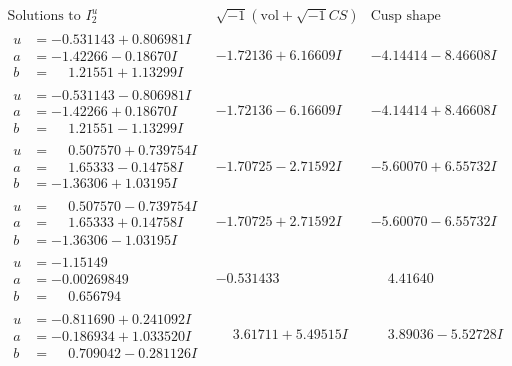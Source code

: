 \documentclass[1p]{elsarticle_modified}
\theoremstyle{definition}
\newcommand{\I}{\sqrt{-1}}
\begin{document}
$$\begin{array}{c|c|c}  
\text{Solutions to }I^u_{2}& \I (\text{vol} + \sqrt{-1}CS) & \text{Cusp shape}\\
 \hline 
\begin{aligned}
u &= -0.531143 + 0.806981 I \\
a &= -1.42266 - 0.18670 I \\
b &= \phantom{-}1.21551 + 1.13299 I\end{aligned}
 & -1.72136 + 6.16609 I & -4.14414 - 8.46608 I \\ \hline\begin{aligned}
u &= -0.531143 - 0.806981 I \\
a &= -1.42266 + 0.18670 I \\
b &= \phantom{-}1.21551 - 1.13299 I\end{aligned}
 & -1.72136 - 6.16609 I & -4.14414 + 8.46608 I \\ \hline\begin{aligned}
u &= \phantom{-}0.507570 + 0.739754 I \\
a &= \phantom{-}1.65333 - 0.14758 I \\
b &= -1.36306 + 1.03195 I\end{aligned}
 & -1.70725 - 2.71592 I & -5.60070 + 6.55732 I \\ \hline\begin{aligned}
u &= \phantom{-}0.507570 - 0.739754 I \\
a &= \phantom{-}1.65333 + 0.14758 I \\
b &= -1.36306 - 1.03195 I\end{aligned}
 & -1.70725 + 2.71592 I & -5.60070 - 6.55732 I \\ \hline\begin{aligned}
u &= -1.15149\phantom{ +0.000000I} \\
a &= -0.00269849\phantom{ +0.000000I} \\
b &= \phantom{-}0.656794\phantom{ +0.000000I}\end{aligned}
 & -0.531433\phantom{ +0.000000I} & \phantom{-}4.41640\phantom{ +0.000000I} \\ \hline\begin{aligned}
u &= -0.811690 + 0.241092 I \\
a &= -0.186934 + 1.033520 I \\
b &= \phantom{-}0.709042 - 0.281126 I\end{aligned}
 & \phantom{-}3.61711 + 5.49515 I & \phantom{-}3.89036 - 5.52728 I \\ \hline\begin{aligned}

\end{aligned}
\end{array}$$
\end{document}
